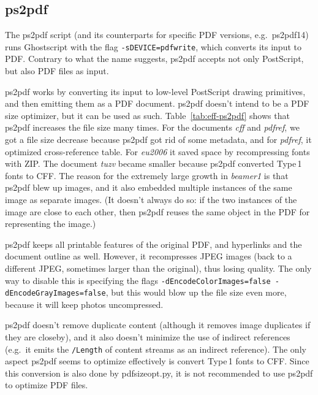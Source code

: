 \documentclass{ltugproc}
\def\cmd{\textsf}
\begin{document}
\subsection{ps2pdf}

The \cmd{ps2pdf} \cite{ps2pdf} script (and its counterparts for specific PDF
versions, e.g.\ \cmd{ps2pdf14}) runs Ghostscript with the flag
\texttt{-sDEVICE=pdfwrite}, which converts its input to PDF. Contrary to
what the name suggests, \cmd{ps2pdf} accepts not only PostScript, but also
PDF files as input.

\cmd{ps2pdf} works by converting its input to low-level PostScript drawing
primitives, and then emitting them as a PDF document. \cmd{ps2pdf} doesn't
intend to be a PDF size optimizer, but it can be used as such.
Table~\ref{tab:eff-ps2pdf} shows that \cmd{ps2pdf} increases the file size
many times. For the documents \emph{cff} and \emph{pdfref}, we got a file
size decrease because \cmd{ps2pdf} got rid of some metadata, and for
\emph{pdfref}, it optimized cross-reference table. For \emph{eu2006} it
saved space by recompressing fonts with ZIP. The document \emph{tuzv} became
smaller because \cmd{ps2pdf} converted Type\,1 fonts to CFF. The reason for
the extremely large growth in \emph{beamer1} is that \cmd{ps2pdf} blew up
images, and it also embedded multiple instances of the same image as
separate images. (It doesn't always do so: if the two instances of the image
are close to each other, then \cmd{ps2pdf} reuses the same object in the PDF
for representing the image.)

\cmd{ps2pdf} keeps all printable features of the original PDF, and
hyperlinks and the document outline as well. However, it recompresses JPEG
images (back to a different JPEG, sometimes larger than the original), thus
losing quality. The only way to disable this is specifying the flags
\texttt{-dEncodeColorImages=false -dEncodeGrayImages=false}, but this would
blow up the file size even more, because it will keep photos uncompressed.

\cmd{ps2pdf} doesn't remove duplicate content (although it
removes image duplicates if they are closeby), and it also doesn't minimize
the use of indirect references (e.g.\ it emits the \texttt{/Length} of
content streams as an indirect reference). The only aspect \cmd{ps2pdf}
seems to optimize effectively is convert Type\,1 fonts to CFF. Since this
conversion is also done by \cmd{pdfsizeopt.py}, it is
not recommended to use \cmd{ps2pdf} to optimize PDF files.
\end{document}

